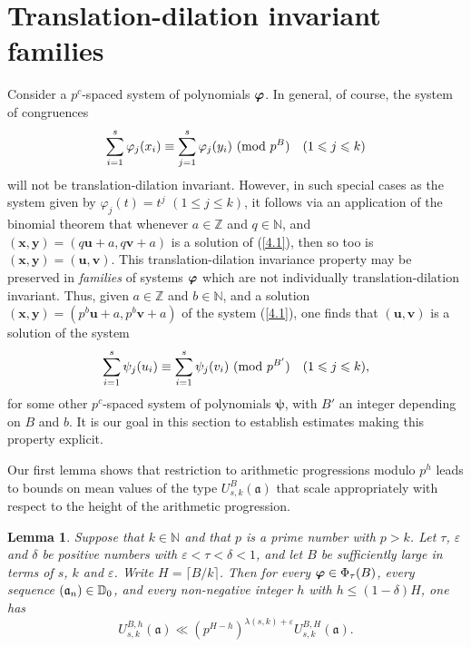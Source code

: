 \documentclass[12pt,reqno]{amsart}
\newtheorem{lemma}[theorem]{Lemma}
\theoremstyle{definition}
\theoremstyle{remark}
\numberwithin{equation}{section}
\newcommand{\mmod}[1]{\,\,(\text{\rm mod}\,\,#1)}
\def\bfu{{\mathbf u}}
\def\bfv{{\mathbf v}}
\def\bfx{{\mathbf x}}
\def\bfy{{\mathbf y}}
\def\dbN{{\mathbb N}} \def\dbO{{\mathbb O}} \def\dbP{{\mathbb P}}
\def\dbZ{{\mathbb Z}}\def\dbQ{{\mathbb Q}}
\def\gra{{\mathfrak a}}\def\grA{{\mathfrak A}}\def\bfgra{{\boldsymbol \gra}}
\def\del{{\delta}} \def\Del{{\Delta}} \def\Deltil{{\widetilde \Delta}}
\def\lam{{\lambda}} \def\Lam{{\Lambda}} \def\Lamtil{{\widetilde \Lambda}}
\def\bfpsi{{\boldsymbol \psi}} \def\bfPsi{{\boldsymbol \Psi}}
\def\eps{\varepsilon}
\def\le{\leqslant} \def\ge{\geqslant} \def\pleq{\preccurlyeq} \def\ple{\prec}
\begin{document}
\section{Translation-dilation invariant families} Consider a $p^c$-spaced system of 
polynomials ${\boldsymbol \varphi}$. In general, of course, the system of congruences
\begin{equation}\label{4.1}
\sum_{i=1}^s\varphi_j(x_i)\equiv \sum_{j=1}^s\varphi_j(y_i)\mmod{p^B}\quad 
(1\le j\le k)
\end{equation}
will not be translation-dilation invariant. However, in such special cases as the system 
given by $\varphi_j(t)=t^j$ $(1\le j\le k)$, it follows via an application of the binomial 
theorem that whenever $a\in \dbZ$ and $q\in \dbN$, and 
$(\bfx,\bfy)=(q\bfu+a,q\bfv+a)$ is a solution of (\ref{4.1}), then so too is $(\bfx,\bfy)=
(\bfu,\bfv)$. This translation-dilation invariance property may be preserved in 
{\it families} of systems ${\boldsymbol \varphi}$ which are not individually translation-dilation 
invariant. Thus, given $a\in \dbZ$ and $b\in \dbN$, and a solution $(\bfx,\bfy)=
(p^b\bfu+a,p^b\bfv+a)$ of the system (\ref{4.1}), one finds that $(\bfu,\bfv)$ is a 
solution of the system
$$\sum_{i=1}^s\psi_j(u_i)\equiv \sum_{i=1}^s\psi_j(v_i)\mmod{p^{B'}}\quad 
(1\le j\le k),$$
for some other $p^c$-spaced system of polynomials $\bfpsi$, with $B'$ an integer 
depending on $B$ and $b$. It is our goal in this section to establish estimates making this 
property explicit.\par

Our first lemma shows that restriction to arithmetic progressions modulo $p^h$ leads to 
bounds on mean values of the type $U_{s,k}^B(\bfgra)$ that scale appropriately with 
respect to the height of the arithmetic progression.

\begin{lemma}\label{lemma4.1} Suppose that $k\in \dbN$ and that $p$ is a prime 
number with $p>k$. Let $\tau$, $\eps$ and $\del$ be positive numbers with 
$\eps<\tau<\del<1$, and let $B$ be sufficiently large in terms of $s$, $k$ and $\eps$. 
Write $H=\lceil B/k\rceil$. Then for every ${\boldsymbol \varphi}\in \Phi_\tau(B)$, every sequence 
$(\gra_n)\in \dbD_0$, and every non-negative integer $h$ with $h\le (1-\del )H$, one has
$$U_{s,k}^{B,h}(\bfgra)\ll (p^{H-h})^{\lam(s,k)+\eps}U_{s,k}^{B,H}(\bfgra).$$
\end{lemma}
\end{document}
